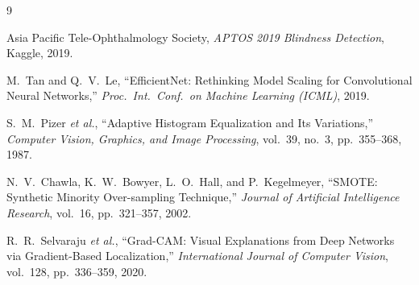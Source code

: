 \documentclass[11pt,a4paper]{article}
\begin{document}
\begin{thebibliography}{9}

Asia Pacific Tele-Ophthalmology Society,
\emph{APTOS 2019 Blindness Detection},
Kaggle, 2019.

M.~Tan and Q.~V.~Le,
``EfficientNet: Rethinking Model Scaling for Convolutional Neural Networks,''
\emph{Proc.\ Int.\ Conf.\ on Machine Learning (ICML)}, 2019.

S.~M.~Pizer \emph{et al.},
``Adaptive Histogram Equalization and Its Variations,''
\emph{Computer Vision, Graphics, and Image Processing}, vol.~39, no.~3,
pp.~355--368, 1987.

N.~V.~Chawla, K.~W.~Bowyer, L.~O.~Hall, and P.~Kegelmeyer,
``SMOTE: Synthetic Minority Over-sampling Technique,''
\emph{Journal of Artificial Intelligence Research}, vol.~16, pp.~321--357,
2002.

R.~R.~Selvaraju \emph{et al.},
``Grad-CAM: Visual Explanations from Deep Networks via Gradient-Based Localization,''
\emph{International Journal of Computer Vision}, vol.~128, pp.~336--359, 2020.

\end{thebibliography}
\end{document}
